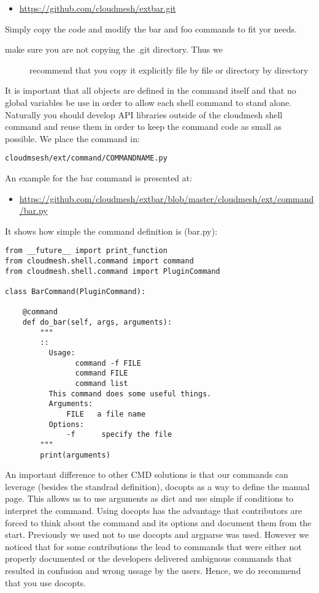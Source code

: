 \begin{itemize}
\tightlist
\item
  \url{https://github.com/cloudmesh/extbar.git}
\end{itemize}

Simply copy the code and modify the bar and foo commands to fit yor
needs.

\begin{description}
\item[make sure you are not copying the .git directory. Thus we]
recommend that you copy it explicitly file by file or directory by
directory
\end{description}

It is important that all objects are defined in the command itself and
that no global variables be use in order to allow each shell command to
stand alone. Naturally you should develop API libraries outside of the
cloudmesh shell command and reuse them in order to keep the command code
as small as possible. We place the command in:

\begin{verbatim}
cloudmsesh/ext/command/COMMANDNAME.py
\end{verbatim}

An example for the bar command is presented at:

\begin{itemize}
\tightlist
\item
  \url{https://github.com/cloudmesh/extbar/blob/master/cloudmesh/ext/command/bar.py}
\end{itemize}

It shows how simple the command definition is (bar.py):

\begin{verbatim}
from __future__ import print_function
from cloudmesh.shell.command import command
from cloudmesh.shell.command import PluginCommand

class BarCommand(PluginCommand):

    @command
    def do_bar(self, args, arguments):
        """
        ::
          Usage:
                command -f FILE
                command FILE
                command list
          This command does some useful things.
          Arguments:
              FILE   a file name
          Options:
              -f      specify the file
        """
        print(arguments)
\end{verbatim}

An important difference to other CMD solutions is that our commands can
leverage (besides the standrad definition), docopts as a way to define
the manual page. This allows us to use arguments as dict and use simple
if conditions to interpret the command. Using docopts has the advantage
that contributors are forced to think about the command and its options
and document them from the start. Previously we used not to use docopts
and argparse was used. However we noticed that for some contributions
the lead to commands that were either not properly documented or the
developers delivered ambiguous commands that resulted in confusion and
wrong ussage by the users. Hence, we do recommend that you use docopts.

